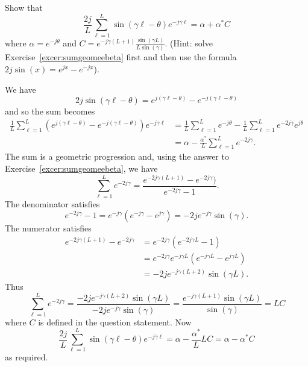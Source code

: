 \begin{excersizelist}
\item \label{excer:sumsinegeomean} Show that 
\[
\frac{2j}{L}\sum_{\ell=1}^{L}\sin( \gamma \ell - \theta)  e^{-j \gamma \ell} = \alpha + \alpha^*C
\]
where $\alpha = e^{-j\theta}$ and $C = e^{-j\gamma (L+1)}\frac{\sin(\gamma L)}{L\sin(\gamma)}$. (Hint: solve Exercise~\ref{excer:sumgeomeebeta} first and then use the formula $2j\sin(x) = e^{jx} -  e^{-jx}$).
\begin{solution}
We have 
\[
2j\sin(\gamma \ell - \theta) = e^{j(\gamma \ell - \theta)} -  e^{-j(\gamma \ell - \theta)}
\]
and so the sum becomes
\begin{align*}
\frac{1}{L}\sum_{\ell=1}^{L}(e^{j(\gamma \ell - \theta)} - e^{-j(\gamma \ell - \theta)})  e^{-j \gamma \ell} &= \frac{1}{L}\sum_{\ell=1}^{L}e^{-j\theta} - \frac{1}{L}\sum_{\ell=1}^{L}e^{-2j\gamma}e^{j\theta} \\
&= \alpha - \frac{\alpha^*}{L}\sum_{\ell=1}^{L}e^{-2j\gamma}.
\end{align*}
The sum is a geometric progression and, using the answer to Exercise~\ref{excer:sumgeomeebeta}, we have
\[
\sum_{\ell=1}^{L}e^{-2j\gamma} = \frac{e^{-2j\gamma (L+1)} - e^{-2j\gamma})}{e^{-2j\gamma} - 1}.
\]
The denominator satisfies
\[
e^{-2j\gamma} - 1 = e^{-j\gamma}(e^{-j\gamma} - e^{j\gamma}) = -2 j e^{-j\gamma} \sin(\gamma). 
\]
The numerator satisfies
\begin{align*}
e^{-2j\gamma (L+1)} - e^{-2j\gamma} &= e^{-2j\gamma}(e^{-2j\gamma L} - 1) \\
&= e^{-2j\gamma}e^{-j\gamma L} (e^{-j\gamma L} - e^{j\gamma L}) \\
&= -2 j e^{-j\gamma(L+2)} \sin(\gamma L).
\end{align*}
Thus
\[
\sum_{\ell=1}^{L}e^{-2j\gamma} = \frac{-2 j e^{-j\gamma(L+2)} \sin(\gamma L)}{-2 j e^{-j\gamma} \sin(\gamma)} = \frac{e^{-j\gamma(L+1)} \sin(\gamma L)}{ \sin(\gamma)} = L C
\]
where $C$ is defined in the question statement.  Now
\[
\frac{2j}{L}\sum_{\ell=1}^{L}\sin( \gamma \ell - \theta)  e^{-j \gamma \ell} = \alpha - \frac{\alpha^*}{L}LC = \alpha - \alpha^*C
\]
as required.
\end{solution}


\end{excersizelist}
